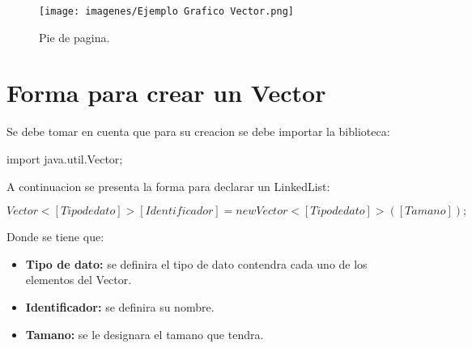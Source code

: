\documentclass[12pt, letterpaper]{article} %
\begin{document}
\begin{figure}[h]
    \centering
    \texttt{[image: imagenes/Ejemplo Grafico Vector.png]}
    \caption{Pie de pagina.}
    \label{fig:vector}
\end{figure}

\section*{Forma para crear un Vector}
Se debe tomar en cuenta que para su creacion se debe importar la biblioteca:
\begin{center}
    import java.util.Vector;
\end{center}
A continuacion se presenta la forma para declarar un LinkedList:
\begin{center}
    $Vector<[Tipo de dato]> [Identificador] = new Vector<[Tipo de dato]>([Tamano]);$
\end{center}

Donde se tiene que:
\begin{itemize}
    \item \textbf{Tipo de dato:} se definira el tipo de dato contendra cada uno de los elementos del Vector.
    \item \textbf{Identificador:} se definira su nombre.
    \item \textbf{Tamano:} se le designara el tamano que tendra.
\end{itemize}
\end{document}

